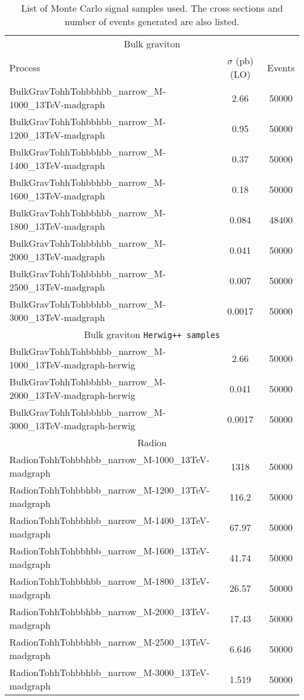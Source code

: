 \begin{table}[H]
  \begin{center}
    \begin{tabular}{l|c|c}
      \hline
      \hline
      \multicolumn{3}{c}{Bulk graviton} \\ \cline{1-3}
      Process & $\sigma$ (pb) (LO) & Events\\ \hline
      \hline
      {BulkGravTohhTohbbhbb\_narrow\_M-1000\_13TeV-madgraph} & 2.66 &50000 \\
      {BulkGravTohhTohbbhbb\_narrow\_M-1200\_13TeV-madgraph} & 0.95 & 50000 \\
      {BulkGravTohhTohbbhbb\_narrow\_M-1400\_13TeV-madgraph} & 0.37 & 50000 \\
      {BulkGravTohhTohbbhbb\_narrow\_M-1600\_13TeV-madgraph} & 0.18 & 50000 \\
      {BulkGravTohhTohbbhbb\_narrow\_M-1800\_13TeV-madgraph} & 0.084 & 48400 \\
      {BulkGravTohhTohbbhbb\_narrow\_M-2000\_13TeV-madgraph} & 0.041 & 50000 \\
      {BulkGravTohhTohbbhbb\_narrow\_M-2500\_13TeV-madgraph} & 0.007 & 50000 \\
      {BulkGravTohhTohbbhbb\_narrow\_M-3000\_13TeV-madgraph} & 0.0017 & 50000 \\
      \hline
      \multicolumn{3}{c}{Bulk graviton \texttt{Herwig++ samples}} \\ \cline{1-3}
      {BulkGravTohhTohbbhbb\_narrow\_M-1000\_13TeV-madgraph-herwig} & 2.66  & 50000 \\
      {BulkGravTohhTohbbhbb\_narrow\_M-2000\_13TeV-madgraph-herwig} & 0.041 & 50000 \\
      {BulkGravTohhTohbbhbb\_narrow\_M-3000\_13TeV-madgraph-herwig} & 0.0017& 50000 \\
      \hline
      \multicolumn{3}{c}{Radion} \\ \cline{1-3}
      \hline
      {RadionTohhTohbbhbb\_narrow\_M-1000\_13TeV-madgraph} & 1318  & 50000 \\
      {RadionTohhTohbbhbb\_narrow\_M-1200\_13TeV-madgraph} & 116.2 & 50000 \\
      {RadionTohhTohbbhbb\_narrow\_M-1400\_13TeV-madgraph} & 67.97 & 50000 \\
      {RadionTohhTohbbhbb\_narrow\_M-1600\_13TeV-madgraph} & 41.74 & 50000 \\
      {RadionTohhTohbbhbb\_narrow\_M-1800\_13TeV-madgraph} & 26.57 & 50000 \\
      {RadionTohhTohbbhbb\_narrow\_M-2000\_13TeV-madgraph} & 17.43 & 50000 \\
      {RadionTohhTohbbhbb\_narrow\_M-2500\_13TeV-madgraph} & 6.646 & 50000 \\
      {RadionTohhTohbbhbb\_narrow\_M-3000\_13TeV-madgraph} & 1.519 & 50000 \\
      \hline
      \hline
    \end{tabular}
  \end{center}
  \caption{List of Monte Carlo signal samples used. The cross sections and number of events generated are also listed. \label{tab:signal_MC}}
\end{table}

